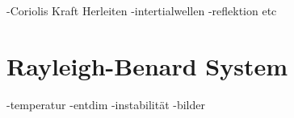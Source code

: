 -Coriolis Kraft Herleiten
-intertialwellen
-reflektion etc

\section{Rayleigh-Benard System}
-temperatur
-entdim
-instabilität
-bilder





